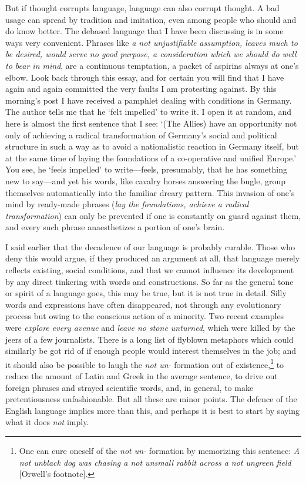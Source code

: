 But if thought corrupts language, language can also corrupt thought. A
bad usage can spread by tradition and imitation, even among people who
should and do know better. The debased language that I have been
discussing is in some ways very convenient. Phrases like \textit{a not
unjustifiable assumption, leaves much to be desired, would serve no
good purpose, a consideration which we should do well to bear in
mind}, are a continuous temptation, a packet of aspirins always at
one's elbow. Look back through this essay, and for certain you will
find that I have again and again committed the very faults I am
protesting against. By this morning's post I have received a pamphlet
dealing with conditions in Germany. The author tells me that he `felt
impelled' to write it. I open it at random, and here is almost the
first sentence that I see: `(The Allies) have an opportunity not only
of achieving a radical transformation of Germany's social and
political structure  in such a way as to avoid a
nationalistic reaction in Germany itself, but at the same time of
laying the foundations of a co-operative and unified Europe.' You see,
he `feels impelled' to write---feels, presumably, that he has
something new to say---and yet his words, like cavalry horses
answering the bugle, group themselves automatically into the familiar
dreary pattern. This invasion of one's mind by ready-made phrases
(\textit{lay the foundations, achieve a radical transformation}) can
only be prevented if one is constantly on guard against them, and
every such phrase anaesthetizes a portion of one's brain.

I said earlier that the decadence of our language is probably curable.
Those who deny this would argue, if they produced an argument at all,
that language merely reflects existing, social conditions, and that we
cannot influence its development by any direct tinkering with words
and constructions. So far as the general tone or spirit of a language
goes, this may be true, but it is not true in detail. Silly words and
expressions have often disappeared, not through any evolutionary
process but owing to the conscious action of a minority. Two recent
examples were \textit{explore every avenue} and \textit{leave no stone
unturned}, which were killed by the jeers of a few journalists. There
is a long list of flyblown metaphors which could similarly be got rid
of if enough people would interest themselves in the job; and it
should also be possible to laugh the \textit{not un-} formation out of
existence,\footnote{One can cure oneself of the \textit{not un-}
formation by memorizing this sentence: \textit{A not unblack dog was
chasing a not unsmall rabbit across a not ungreen field} [Orwell's
footnote].} to reduce the amount of Latin and Greek in the average
sentence, to drive out foreign phrases and strayed scientific words,
and, in general, to make pretentiousness unfashionable. But all these
are minor points. The defence of the English language implies more
than this, and perhaps it is best to start by saying what it does
\textit{not} imply.

